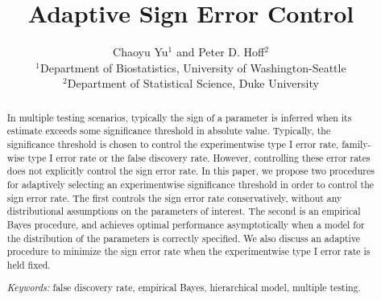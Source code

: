 \documentclass[11pt]{article}
\begin{document}
\title{Adaptive Sign Error Control}
\author{Chaoyu Yu$^{1}$ and  Peter D. Hoff$^{2}$ \\
	$^1$Department of Biostatistics, University of Washington-Seattle \\
	$^2$Department of Statistical Science, Duke University}
\maketitle



\begin{abstract}
	
	In multiple testing scenarios, typically the sign of a parameter is inferred when its estimate exceeds some significance threshold in absolute value. Typically, the significance threshold is chosen to control the experimentwise type I error rate, family-wise type I error rate or the false discovery rate. However, controlling these error rates does not explicitly control the sign error rate. 
In this paper, we propose two procedures for adaptively selecting an experimentwise significance threshold in order to control the sign error rate. The first controls the sign error rate conservatively, without any distributional assumptions on the parameters of interest. The second is an empirical Bayes procedure, and achieves optimal performance asymptotically when a model for the 
distribution of the parameters is correctly specified. We also discuss an adaptive procedure to minimize the sign error rate when the experimentwise type I error rate is held fixed.


\smallskip
\noindent \textit{Keywords:} false discovery rate, empirical Bayes, hierarchical model, multiple testing. 
\end{abstract}
\end{document}
